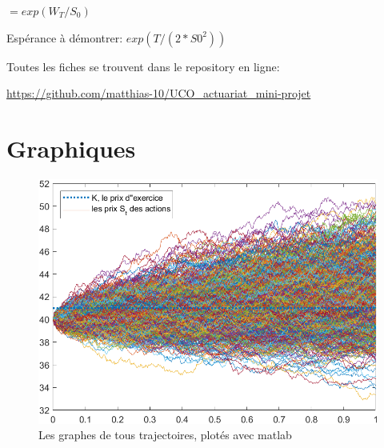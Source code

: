 \documentclass[a4paper,12pt]{scrartcl}
\begin{document}
$=exp(W_T/S_0)$

Espérance à démontrer:
$exp(T/(2*S0^2))$



\clearpage

\appendix
\appendixpage
\addappheadtotoc

\begin{center}
Toutes les fiches se trouvent dans le repository en ligne: 

 \url{https://github.com/matthias-10/UCO_actuariat_mini-projet}
\end{center}

\section{Graphiques} \label{graphiques}

\begin{figure}[h!]
  \begin{center}
    \includegraphics[width=14cm]{"graphiques/S.png"}
    \caption{Les graphes de tous trajectoires, plotés avec matlab}
    \label{fig:S}
  \end{center}
\end{figure}
\end{document}
